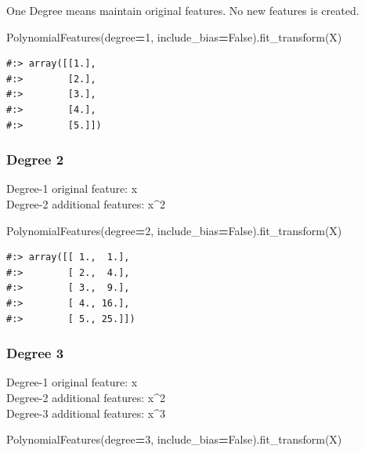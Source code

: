 \documentclass[
]{book}
\newenvironment{Shaded}{\begin{snugshade}}{\end{snugshade}}
\newcommand{\DecValTok}[1]{\textcolor[rgb]{0.06,0.06,0.06}{#1}}
\newcommand{\NormalTok}[1]{#1}
\newcommand{\OperatorTok}[1]{\textcolor[rgb]{0.43,0.43,0.43}{\textbf{#1}}}
\newcommand{\VariableTok}[1]{\textcolor[rgb]{0,0,0}{#1}}
\begin{document}
One Degree means maintain original features. No new features is created.

\begin{Shaded}
\begin{Highlighting}[]
\NormalTok{PolynomialFeatures(degree}\OperatorTok{=}\DecValTok{1}\NormalTok{, include_bias}\OperatorTok{=}\VariableTok{False}\NormalTok{).fit_transform(X)}
\end{Highlighting}
\end{Shaded}

\begin{verbatim}
#:> array([[1.],
#:>        [2.],
#:>        [3.],
#:>        [4.],
#:>        [5.]])
\end{verbatim}

\hypertarget{degree-2}{%
\subsubsection{Degree 2}\label{degree-2}}

Degree-1 original feature: x\\
Degree-2 additional features: x\^{}2

\begin{Shaded}
\begin{Highlighting}[]
\NormalTok{PolynomialFeatures(degree}\OperatorTok{=}\DecValTok{2}\NormalTok{, include_bias}\OperatorTok{=}\VariableTok{False}\NormalTok{).fit_transform(X)}
\end{Highlighting}
\end{Shaded}

\begin{verbatim}
#:> array([[ 1.,  1.],
#:>        [ 2.,  4.],
#:>        [ 3.,  9.],
#:>        [ 4., 16.],
#:>        [ 5., 25.]])
\end{verbatim}

\hypertarget{degree-3}{%
\subsubsection{Degree 3}\label{degree-3}}

Degree-1 original feature: x\\
Degree-2 additional features: x\^{}2\\
Degree-3 additional features: x\^{}3

\begin{Shaded}
\begin{Highlighting}[]
\NormalTok{PolynomialFeatures(degree}\OperatorTok{=}\DecValTok{3}\NormalTok{, include_bias}\OperatorTok{=}\VariableTok{False}\NormalTok{).fit_transform(X)}
\end{Highlighting}
\end{Shaded}
\end{document}
